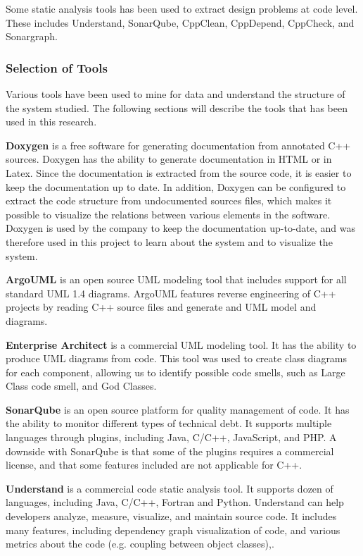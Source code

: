 Some static analysis tools has been used to extract design problems at code level. These includes Understand, SonarQube, CppClean, CppDepend, CppCheck, and Sonargraph. 

\subsubsection{Selection of Tools}
Various tools have been used to mine for data and understand the structure of the system studied. The following sections will describe the tools that has been used in this research.

\textbf{Doxygen} is a free software for generating documentation from annotated C++ sources. Doxygen has the ability to generate documentation in HTML or in Latex. Since the documentation is extracted from the source code, it is easier to keep the documentation up to date. In addition, Doxygen can be configured to extract the code structure from undocumented sources files, which makes it possible to visualize the relations between various elements in the software. Doxygen is used by the company to keep the documentation up-to-date, and was therefore used in this project to learn about the system and to visualize the system.

\textbf{ArgoUML} is an open source UML modeling tool that includes support for all standard UML 1.4 diagrams\cite{argouml}. ArgoUML features reverse engineering of C++ projects by reading C++ source files and generate and UML model and diagrams. 

\textbf{Enterprise Architect} is a commercial UML modeling tool. It has the ability to produce UML diagrams from code. This tool was used to create class diagrams for each component, allowing us to identify possible code smells, such as Large Class code smell, and God Classes.

\textbf{SonarQube} is an open source platform for quality management of code. It has the ability to monitor different types of technical debt. It supports multiple languages through plugins, including Java, C/C++, JavaScript, and PHP. A downside with SonarQube is that some of the plugins requires a commercial license, and that some features included are not applicable for C++.

\textbf{Understand}  is a commercial code static analysis tool. It supports dozen of languages, including Java, C/C++, Fortran and Python. Understand can help developers analyze, measure, visualize, and maintain source code. It includes many features, including dependency graph visualization of code, and various metrics about the code (e.g. coupling between object classes),. 

